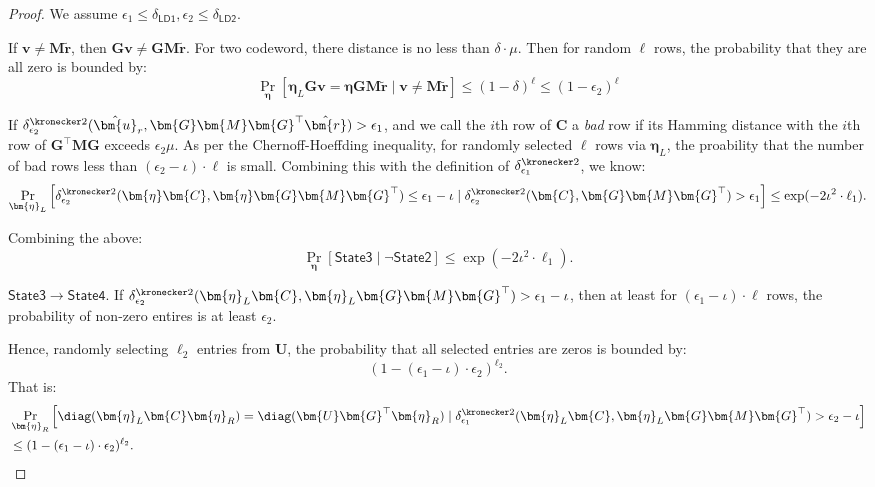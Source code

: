\begin{proof}
We assume $\epsilon_1 \le \delta_\mathsf{LD1}, \epsilon_2  \le \delta_\mathsf{LD2}$.

If $\bm{v} \ne \bm{M}\tilde{\bm{r}}$, then $\bm{G}\bm{v} \ne \bm{G}\bm{M}\tilde{\bm{r}}$.
For two codeword, there distance is no less than $\delta \cdot \mu$.
Then for random $\ell$ rows, the probability that they are all zero is bounded by:
\[
    \Pr_{\bm{\eta}} \left[ \bm{\eta}_L\bm{G}\bm{v} = \bm{\eta}\bm{G}\bm{M}\tilde{\bm{r}} \mid \bm{v} \ne \bm{M}\tilde{\bm{r}} \right]
    \le (1-\delta)^\ell
    \le (1-\epsilon_2)^\ell
\]


If $\delta_{\epsilon_2}^{\kronecker 2}(\hat{\bm{u}}_r, \bm{G}\bm{M}\bm{G}^\top\hat{\bm{r}}) > \epsilon_1$,
and we call the $i$th row of $\bm{C}$ a \emph{bad} row
if its Hamming distance with the $i$th row of $\bm{G}^\top \bm{M} \bm{G}$ exceeds $\epsilon_2 \mu$.
As per the Chernoff-Hoeffding inequality,
for randomly selected $\ell$ rows via $\bm{\eta}_L$,
the proability that the number of bad rows less than $(\epsilon_2 - \iota) \cdot \ell$ is small.
Combining this with the definition of $\delta_{\epsilon_1}^{\kronecker 2}$,
we know:
\[
    \Pr_{\bm{\eta}_L} \left[
        \delta_{\epsilon_2}^{\kronecker 2}(\bm{\eta}\bm{C}, \bm{\eta}\bm{G}\bm{M}\bm{G}^\top) \le \epsilon_1 - \iota
        \mid
        \delta_{\epsilon_2}^{\kronecker 2}(\bm{C}, \bm{G}\bm{M}\bm{G}^\top) > \epsilon_1
    \right]
    \le \exp (-2 \iota^2 \cdot \ell_1).
\]

Combining the above:
\[
    \Pr_{\bm{\eta}}\left[ \mathsf{State3} \mid \neg \mathsf{State2} \right] \le  \exp(-2\iota^2 \cdot \ell_1).
\]


\noindent
{$\mathsf{State3} \rightarrow \mathsf{State4}$.}
If $\delta_{\epsilon_2}^{\kronecker 2}(\bm{\eta}_L\bm{C}, \bm{\eta}_L\bm{G}\bm{M}\bm{G}^\top) > \epsilon_1 - \iota$,
then at least for $(\epsilon_1 - \iota)\cdot \ell$ rows,
the probability of non-zero entires is at least $\epsilon_2$.

Hence, randomly selecting $\ell_2$ entries from $\bm{U}$,
the probability that all selected entries are zeros is bounded by:
\[
    (1-(\epsilon_1 - \iota)\cdot \epsilon_2)^{\ell_2}.
\]
That is:
\begin{align*}
&
    \Pr_{\bm{\eta}_R}
    \left[
        \mathsf{\diag}(\bm{\eta}_L\bm{C}\bm{\eta}_R)
        = \mathsf{\diag}(\bm{U}\bm{G}^\top\bm{\eta}_R)
        \mid
        \delta_{\epsilon_1}^{\kronecker 2}(\bm{\eta}_L\bm{C}, \bm{\eta}_L\bm{G}\bm{M}\bm{G}^\top) > \epsilon_2 - \iota
    \right]
    \\&
    \le (1-(\epsilon_1 - \iota)\cdot \epsilon_2)^{\ell_2}.
\end{align*}


\end{proof}
